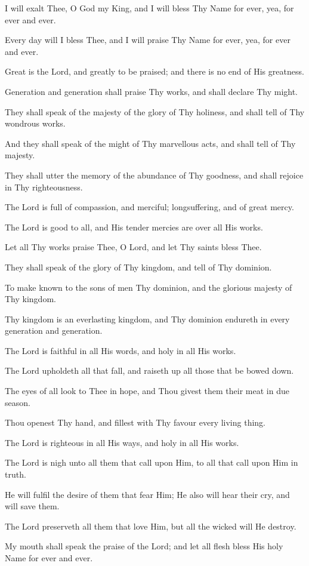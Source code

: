 I will exalt Thee, O God my King, and I will bless Thy Name for ever, yea, for ever and ever.

Every day will I bless Thee, and I will praise Thy Name for ever, yea, for ever and ever.

Great is the Lord, and greatly to be praised; and there is no end of His greatness.

Generation and generation shall praise Thy works, and shall declare Thy might.

They shall speak of the majesty of the glory of Thy holiness, and shall tell of Thy wondrous works.

And they shall speak of the might of Thy marvellous acts, and shall tell of Thy majesty.

They shall utter the memory of the abundance of Thy goodness, and shall rejoice in Thy righteousness.

The Lord is full of compassion, and merciful; longsuffering, and of great mercy.

The Lord is good to all, and His tender mercies are over all His works.

Let all Thy works praise Thee, O Lord, and let Thy saints bless Thee.

They shall speak of the glory of Thy kingdom, and tell of Thy dominion.

To make known to the sons of men Thy dominion, and the glorious majesty of Thy kingdom.

Thy kingdom is an everlasting kingdom, and Thy dominion endureth in every generation and generation.

The Lord is faithful in all His words, and holy in all His works.

The Lord upholdeth all that fall, and raiseth up all those that be bowed down.
 
The eyes of all look to Thee in hope, and Thou givest them their meat in due season.

Thou openest Thy hand, and fillest with Thy favour every living thing.

The Lord is righteous in all His ways, and holy in all His works.

The Lord is nigh unto all them that call upon Him, to all that call upon Him in truth.

He will fulfil the desire of them that fear Him; He also will hear their cry, and will save them.

The Lord preserveth all them that love Him, but all the wicked will He destroy.

My mouth shall speak the praise of the Lord; and let all flesh bless His holy Name for ever and ever.
